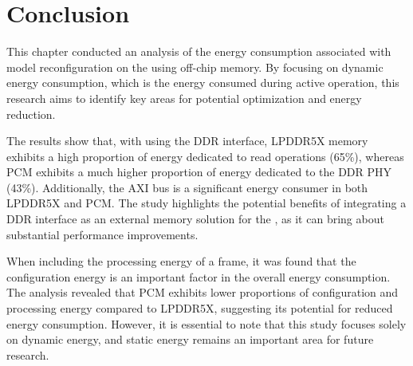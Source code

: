 \section{Conclusion}
This chapter conducted an analysis of the energy consumption associated with model reconfiguration on the \graicore{} using off-chip memory.
By focusing on dynamic energy consumption, which is the energy consumed during active operation, this research aims to identify key areas for potential optimization and energy reduction.

The results show that, with using the DDR interface, LPDDR5X memory exhibits a high proportion of energy dedicated to read operations (65\%), whereas PCM exhibits a much higher proportion of energy dedicated to the DDR PHY (43\%).
Additionally, the AXI bus is a significant energy consumer in both LPDDR5X and PCM.
The study highlights the potential benefits of integrating a DDR interface as an external memory solution for the \graicore{}, as it can bring about substantial performance improvements.

When including the processing energy of a frame, it was found that the configuration energy is an important factor in the overall energy consumption.
The analysis revealed that PCM exhibits lower proportions of configuration and processing energy compared to LPDDR5X, suggesting its potential for reduced energy consumption.
However, it is essential to note that this study focuses solely on dynamic energy, and static energy remains an important area for future research.
